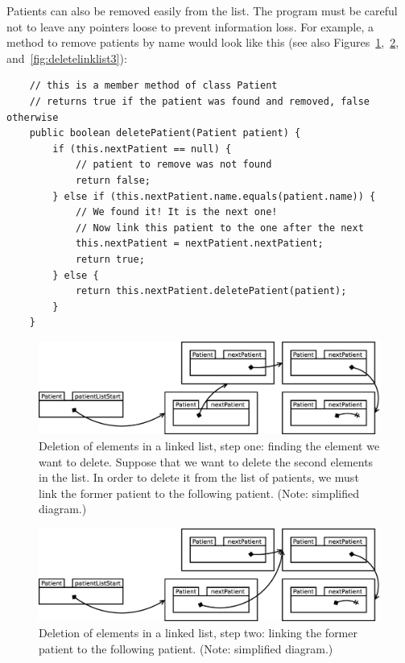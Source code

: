 
Patients can also be removed easily from the list. The program must be
careful not to leave any pointers loose to prevent information
loss. For example, a method to remove patients by name would look like
this (see also
Figures~\ref{fig:deletelinklist},~\ref{fig:deletelinklist2},
and~\ref{fig:deletelinklist3}):

\begin{verbatim}
    // this is a member method of class Patient
    // returns true if the patient was found and removed, false otherwise
    public boolean deletePatient(Patient patient) {
        if (this.nextPatient == null) {
            // patient to remove was not found
            return false;
        } else if (this.nextPatient.name.equals(patient.name)) {
            // We found it! It is the next one!
            // Now link this patient to the one after the next 
            this.nextPatient = nextPatient.nextPatient;
            return true;
        } else {
            return this.nextPatient.deletePatient(patient);
        }
    }    
\end{verbatim}

\begin{figure}[p]
  \centering
  \includegraphics[width=14cm]{gfx/lists-remove-1}    
  \caption{Deletion of elements in a linked list, step one: finding
    the element we want to delete. Suppose that we want to delete the
    second elements in the list. In order to delete it from the list
    of patients, we must link the 
    former patient to the following patient. 
    (Note: simplified diagram.)}
  \label{fig:deletelinklist}
\end{figure}

\begin{figure}[p]
  \centering
  \includegraphics[width=14cm]{gfx/lists-remove-2}    
  \caption{Deletion of elements in a linked list, step two: linking
    the former patient to the following patient. 
    (Note: simplified diagram.)}
  \label{fig:deletelinklist2}
\end{figure}

